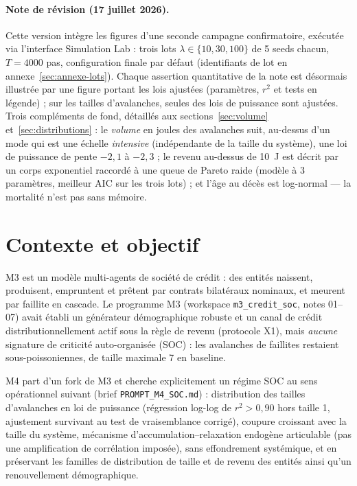 \documentclass[11pt,a4paper]{article}
\newcommand{\code}[1]{\texttt{#1}}
\begin{document}
\paragraph{Note de révision (17 juillet 2026).} Cette version intègre les
figures d'une seconde campagne confirmatoire, exécutée via l'interface
Simulation Lab : trois lots $\lambda \in \{10, 30, 100\}$ de 5 seeds
chacun, $T = 4000$ pas, configuration finale par défaut (identifiants de
lot en annexe~\ref{sec:annexe-lots}). Chaque assertion quantitative de la
note est désormais illustrée par une figure portant les lois ajustées
(paramètres, $r^2$ et tests en légende) ; sur les tailles d'avalanches,
seules des lois de puissance sont ajustées. Trois compléments de fond,
détaillés aux sections~\ref{sec:volume} et~\ref{sec:distributions} : le
\emph{volume} en joules des avalanches suit, au-dessus d'un mode qui est
une échelle \emph{intensive} (indépendante de la taille du système), une
loi de puissance de pente $-2{,}1$ à $-2{,}3$ ; le revenu au-dessus de
10~J est décrit par un corps exponentiel raccordé à une queue de Pareto
raide (modèle à 3 paramètres, meilleur AIC sur les trois lots) ; et
l'âge au décès est log-normal --- la mortalité n'est pas sans mémoire.

\section{Contexte et objectif}

M3 est un modèle multi-agents de société de crédit : des entités naissent,
produisent, empruntent et prêtent par contrats bilatéraux nominaux, et
meurent par faillite en cascade. Le programme M3 (workspace
\code{m3\_credit\_soc}, notes 01--07) avait établi un générateur
démographique robuste et un canal de crédit distributionnellement actif sous
la règle de revenu (protocole X1), mais \emph{aucune} signature de
criticité auto-organisée (SOC) : les avalanches de faillites restaient
sous-poissoniennes, de taille maximale 7 en baseline.

M4 part d'un fork de M3 et cherche explicitement un régime SOC au sens
opérationnel suivant (brief \code{PROMPT\_M4\_SOC.md}) : distribution des
tailles d'avalanches en loi de puissance (régression log-log de $r^2 > 0{,}90$
hors taille 1, ajustement survivant au test de vraisemblance corrigé),
coupure croissant avec la taille du système, mécanisme
d'accumulation--relaxation endogène articulable (pas une amplification de
corrélation imposée), sans effondrement systémique, et en préservant les
familles de distribution de taille et de revenu des entités ainsi qu'un
renouvellement démographique.
\end{document}
